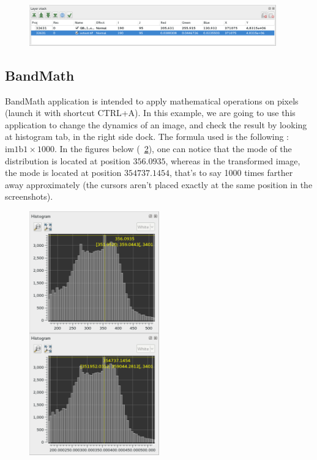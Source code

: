 \begin{figure}[!h] 
  \center
  \includegraphics[width=0.95\textwidth]{../Art/MonteverdiImages/OC.png}
  \label{fig:OC}
\end{figure}



\subsection{BandMath}\label{ssec:monbandmath}

BandMath application is intended to apply mathematical operations on pixels (launch it with shortcut CTRL+A). In this example, we are going to use this application to change the dynamics of an image,
and check the result by looking at histogram tab, in the right side dock. The formula used is the following : $\text{im1b1} \times 1000$.
In the figures below (~\ref{fig:BM}), one can notice that the mode of the distribution is located at position $356.0935$, whereas in the transformed image,
the mode is located at position $354737.1454$, that's to say 1000 times farther away approximately (the cursors aren't placed exactly at the same position in the screenshots).


\begin{figure}[!h] 
  \center
  \includegraphics[width=0.5\textwidth]{../Art/MonteverdiImages/BM.png}
  \label{fig:BM}
\end{figure}


